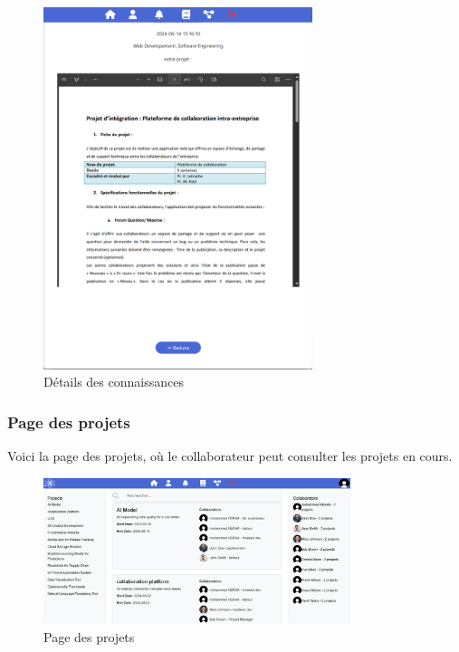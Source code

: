 \documentclass{article}
\begin{document}
                \begin{figure}[h!]
                    \centering
                    \includegraphics[width=0.7\textwidth]{assets/webSite/base-de-connaissance_demo.png}
                    \caption{Détails des connaissances}
                \end{figure}
                \FloatBarrier
            \subsubsection{Page des projets}
                Voici la page des projets, où le collaborateur peut consulter les projets en cours.
                \begin{figure}[h!]
                    \centering
                    \includegraphics[width=0.8\textwidth]{assets/webSite/projectsPage.png}
                    \caption{Page des projets}
                \end{figure}
                \FloatBarrier
\end{document}
